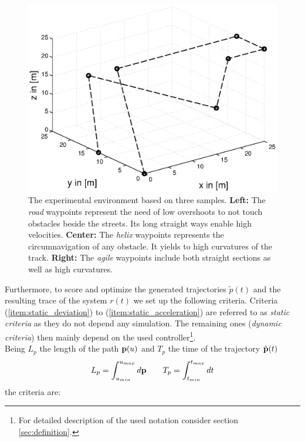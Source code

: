 \begin{figure}[h]
\begin{minipage}[t]{0.32\textwidth}
    \includegraphics[width = \textwidth]{graphics/sampleNodeAgile}
  \end{minipage}
  \caption{The experimental environment based on three samples. {\bf Left:} The \textit{road} waypoints represent the need of low overshoots to not touch obstacles beside the streets. Its long straight ways enable high velocities. {\bf Center:} The \textit{helix} waypoints represents the circumnavigation of any obstacle. It yields to high curvatures of the track. {\bf Right:} The \textit{agile} waypoints include both straight sections as well as high curvatures.}
  \label{fig:sampleNodes}
\end{figure}


Furthermore, to score and optimize the generated trajectories $\tilde{p}(t)$ and the resulting trace of the system $r(t)$ we set up the following criteria. Criteria (\ref{item:static_deviation}) to (\ref{item:static_acceleration}) are referred to as \textit{static criteria} as they do not depend any simulation. The remaining ones (\textit{dynamic criteria}) then mainly depend on the used controller\footnote{For detailed description of the used notation consider section \ref{sec:definition}.}.
\\
Being $L_p$ the length of the path ${\bf p}(u)$ and $T_p$ the time of the trajectory $\tilde{\bf p}(t)$
\begin{equation}
L_p = \int_{u_{min}}^{u_{max}} d{\bf p} \qquad T_p = \int_{t_{min}}^{t_{max}} dt
\label{eq:length_of_path}
\end{equation}
the criteria are:

